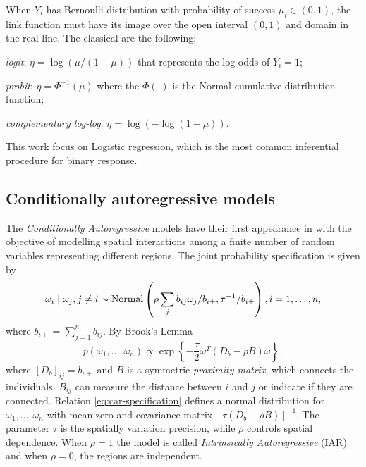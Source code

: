 When $Y_i$ has Bernoulli distribution with probability of success $\mu_i \in
(0,1)$, the link function must have its image over the open interval $(0,1)$
and domain in the real line. The classical are the following:  

\begin{alineas}
  \item \textit{logit}: $\eta = \log(\mu / (1 - \mu))$ that represents 
  the log odds of $Y_i = 1$;
  \item \textit{probit}: $\eta = \Phi^{-1}(\mu)$ where the $\Phi(\cdot)$ 
  is the Normal cumulative distribution function; 
  \item \textit{complementary log-log}: $\eta = \log(-\log(1 - \mu))$.
\end{alineas}

This work focus on Logistic regression, which is the most common inferential
procedure for binary response.

\subsection{Conditionally autoregressive models}
\label{sec:car-models}

The {\em Conditionally Autoregressive} models have their first appearance in
\textcite{besag1974spatial} with the objective of modelling spatial
interactions among a finite number of random variables representing
different regions. The joint probability specification is given by
\cite[Section 3.3.1]{banerjee2003hierarchical}
$$
\omega_i \mid \omega_j, j \neq i \sim \operatorname{Normal}\left(\rho\sum_j b_{ij} \omega_j / b_{i+}, \tau^{-1} / b_{i+}\right), i = 1, \dots, n,
$$
where $b_{i+} = \sum_{j=1}^n b_{ij}$. By Brook's Lemma
\cite{brook1964distinction}
\begin{equation}
  \label{eq:car-specification}
  p(\omega_1, \dots, \omega_n) \propto \exp\left\{ -\frac{\tau}{2}\omega^T(D_{b} - \rho B)\omega\right\},
\end{equation}
where $[D_{b}]_{ij} = b_{i+}$ and $B$
is a symmetric {\em proximity matrix}, which connects the individuals.
$B_{ij}$ can measure the distance between $i$ and $j$ or indicate if they are
connected. Relation \eqref{eq:car-specification} defines a normal
distribution for $\omega_1, \dots, \omega_n$ with mean zero and covariance
matrix $[\tau(D_b - \rho B)]^{-1}$. The parameter $\tau$ is the spatially
variation precision, while $\rho$ controls spatial dependence. When $\rho = 1$
the model is called {\em Intrinsically Autoregressive} (IAR) and when $\rho =
0$, the regions are independent. 


